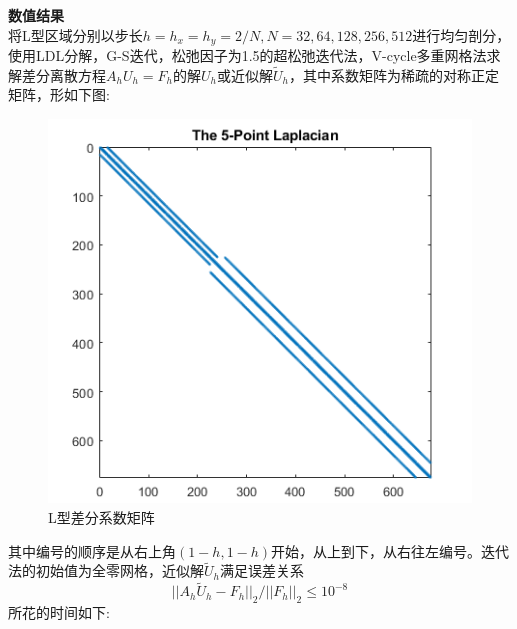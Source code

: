 \documentclass[12pt]{ctexart}
\begin{document}
\noindent \textbf{数值结果}\\
将L型区域分别以步长$h=h_x=h_y=2/N,N=32,64,128,256,512$进行均匀剖分，使用LDL分解，G-S迭代，松弛因子为1.5的超松弛迭代法，V-cycle多重网格法求解差分离散方程$A_hU_h=F_h$的解$U_h$或近似解$\tilde{U}_h$，其中系数矩阵为稀疏的对称正定矩阵，形如下图:\\
\begin{figure}[H]
	\centering
	\includegraphics[width=12cm]{差分矩阵.png}
	\caption{L型差分系数矩阵}
\end{figure}
\noindent 其中编号的顺序是从右上角$(1-h,1-h)$开始，从上到下，从右往左编号。迭代法的初始值为全零网格，近似解$\tilde{U}_h$满足误差关系$$||A_h\tilde{U}_h-F_h||_2/||F_h||_2 \le 10^{-8} $$所花的时间如下:\\
\end{document}
